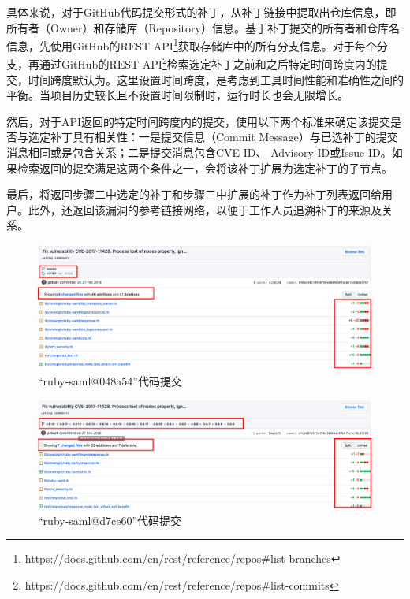 具体来说，对于GitHub代码提交形式的补丁，\tool 从补丁链接中提取出仓库信息，即所有者（Owner）和存储库（Repository）信息。基于补丁提交的所有者和仓库名信息，\tool 先使用GitHub的REST API\footnote{https://docs.github.com/en/rest/reference/repos\#list-branches}获取存储库中的所有分支信息。对于每个分支，\tool 再通过GitHub的REST API\footnote{https://docs.github.com/en/rest/reference/repos\#list-commits}检索选定补丁之前和之后特定时间跨度内的提交，时间跨度默认为。这里设置时间跨度，是考虑到工具时间性能和准确性之间的平衡。当项目历史较长且不设置时间限制时，\tool 运行时长也会无限增长。

然后，对于API返回的特定时间跨度内的提交，\tool 使用以下两个标准来确定该提交是否与选定补丁具有相关性：一是提交信息（Commit Message）与已选补丁的提交消息相同或是包含关系；二是提交消息包含CVE ID、 Advisory ID或Issue ID。如果检索返回的提交满足这两个条件之一，\tool 会将该补丁扩展为选定补丁的子节点。

最后，\tool 将返回步骤二中选定的补丁和步骤三中扩展的补丁作为补丁列表返回给用户。此外，\tool 还返回该漏洞的参考链接网络，以便于工作人员追溯补丁的来源及关系。%

\begin{figure}[!t]
    \centering
    \includegraphics[scale=0.30]{fig/11428-commit-048a54}
    \caption{“ruby-saml@048a54”代码提交}\label{fig:048a54}
\end{figure}

\begin{figure}[!t]
    \centering
    \includegraphics[scale=0.30]{fig/11428-commit-d7ce60}
    \caption{“ruby-saml@d7ce60”代码提交}\label{fig:d7ce60}
\end{figure}

